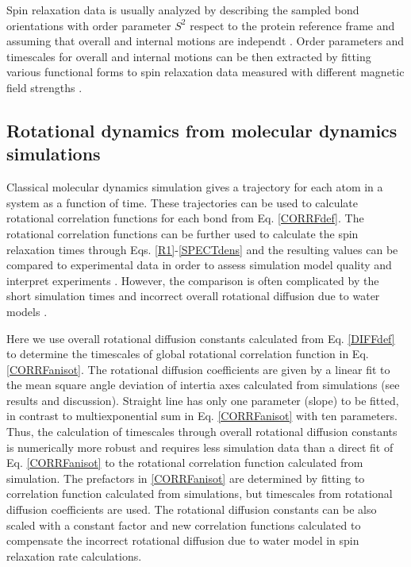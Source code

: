 \documentclass[pre,aps,floatfix,authordate1-4,twocolumn]{revtex4-1}
\begin{document}
Spin relaxation data is usually analyzed by describing the sampled bond
orientations with order parameter $S^2$ respect to the protein reference frame
and assuming that overall and internal motions are independt \cite{??,korzhnev01}.
Order parameters and timescales for overall and internal motions can be then
extracted by fitting various functional forms to spin relaxation data
measured with different magnetic field strengths \cite{jarymowycz06,korzhnev01}.



\subsection{Rotational dynamics from molecular dynamics simulations}\label{MDanalysis}
Classical molecular dynamics simulation gives a trajectory for each atom in
a system as a function of time. These trajectories can be used to
calculate rotational correlation functions for each bond from Eq. \ref{CORRFdef}.
The rotational correlation functions can be further used to calculate the
spin relaxation times through Eqs. \ref{R1}-\ref{SPECTdens} and the resulting
values can be compared to experimental data in order to assess simulation model
quality \cite{??} and interpret experiments \cite{??}.
However, the comparison is often complicated by
the short simulation times \cite{??} and incorrect overall rotational
diffusion due to water models \cite{??}.

Here we use overall rotational diffusion constants
calculated from Eq. \ref{DIFFdef} to determine 
the timescales of global rotational correlation function
in Eq. \ref{CORRFanisot}. The rotational
diffusion coefficients are given by a linear fit
to the mean square angle deviation of intertia axes calculated from
simulations (see results and discussion).
Straight line has only one parameter (slope) to be fitted,
in contrast to multiexponential sum in Eq. \ref{CORRFanisot}
with ten parameters. 
Thus, the calculation of timescales through overall
rotational diffusion constants is numerically more robust and requires
less simulation data than a direct fit of
Eq. \ref{CORRFanisot} to the rotational correlation function calculated
from simulation.
The prefactors in \ref{CORRFanisot} are determined by
fitting to correlation function calculated from simulations,
but timescales from rotational diffusion coefficients are
used. The rotational diffusion constants
can be also scaled with a constant factor and new correlation functions
calculated to compensate the incorrect rotational diffusion due to
water model in spin relaxation rate calculations.
\end{document}
